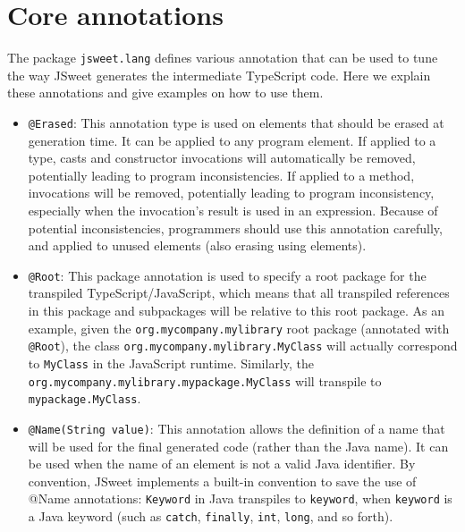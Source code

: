 \documentclass[a4paper]{report}
\begin{document}
\section{Core annotations}

The package \texttt{jsweet.lang} defines various annotation that can be used to tune the way JSweet generates the intermediate TypeScript code. Here we explain these annotations and give examples on how to use them.

\begin{itemize}
\item \texttt{@Erased}: This annotation type is used on elements that should be erased at generation time. It can be applied to any program element. If applied to a type, casts and constructor invocations will automatically be removed, potentially leading to program inconsistencies. If applied to a method, invocations will be removed, potentially leading to program inconsistency, especially when the invocation's result is used in an expression. Because of potential inconsistencies, programmers should use this annotation carefully, and applied to unused elements (also erasing using elements).

\item \texttt{@Root}:  This package annotation is used to specify a root package for the transpiled  TypeScript/JavaScript, which means that all transpiled references in this package and subpackages will be relative to this root package. As an example, given the \texttt{org.mycompany.mylibrary} root package (annotated with \texttt{@Root}), the class \texttt{org\-.mycompany\-.mylibrary\-.MyClass} will actually correspond to \texttt{MyClass} in the JavaScript runtime. Similarly, the \texttt{org\-.mycompany\-.mylibrary\-.mypackage\-.MyClass} will transpile to \texttt{mypackage\-.MyClass}. 

\item \texttt{@Name(String value)}: This annotation allows the definition of a name that will be used for the final generated code (rather than the Java name). It can be used when the name of an element is not a valid Java identifier. By convention, JSweet implements a built-in convention to save the use of @Name annotations: \texttt{Keyword} in Java transpiles to \texttt{keyword}, when \texttt{keyword} is a Java keyword (such as \texttt{catch}, \texttt{finally}, \texttt{int}, \texttt{long}, and so forth).


\end{itemize}
\end{document}
